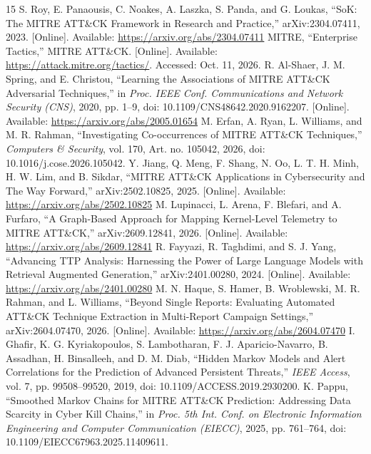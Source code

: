 \documentclass[conference]{IEEEtran}
\begin{document}
\begin{thebibliography}{15}
 S. Roy, E. Panaousis, C. Noakes, A. Laszka, S. Panda, and G. Loukas, ``SoK: The MITRE ATT\&CK Framework in Research and Practice,'' arXiv:2304.07411, 2023. [Online]. Available: \url{https://arxiv.org/abs/2304.07411}
 MITRE, ``Enterprise Tactics,'' MITRE ATT\&CK. [Online]. Available: \url{https://attack.mitre.org/tactics/}. Accessed: Oct. 11, 2026.
 R. Al-Shaer, J. M. Spring, and E. Christou, ``Learning the Associations of MITRE ATT\&CK Adversarial Techniques,'' in \emph{Proc. IEEE Conf. Communications and Network Security (CNS)}, 2020, pp. 1--9, doi: 10.1109/CNS48642.2020.9162207. [Online]. Available: \url{https://arxiv.org/abs/2005.01654}
 M. Erfan, A. Ryan, L. Williams, and M. R. Rahman, ``Investigating Co-occurrences of MITRE ATT\&CK Techniques,'' \emph{Computers \& Security}, vol. 170, Art. no. 105042, 2026, doi: 10.1016/j.cose.2026.105042.
 Y. Jiang, Q. Meng, F. Shang, N. Oo, L. T. H. Minh, H. W. Lim, and B. Sikdar, ``MITRE ATT\&CK Applications in Cybersecurity and The Way Forward,'' arXiv:2502.10825, 2025. [Online]. Available: \url{https://arxiv.org/abs/2502.10825}
 M. Lupinacci, L. Arena, F. Blefari, and A. Furfaro, ``A Graph-Based Approach for Mapping Kernel-Level Telemetry to MITRE ATT\&CK,'' arXiv:2609.12841, 2026. [Online]. Available: \url{https://arxiv.org/abs/2609.12841}
 R. Fayyazi, R. Taghdimi, and S. J. Yang, ``Advancing TTP Analysis: Harnessing the Power of Large Language Models with Retrieval Augmented Generation,'' arXiv:2401.00280, 2024. [Online]. Available: \url{https://arxiv.org/abs/2401.00280}
 M. N. Haque, S. Hamer, B. Wroblewski, M. R. Rahman, and L. Williams, ``Beyond Single Reports: Evaluating Automated ATT\&CK Technique Extraction in Multi-Report Campaign Settings,'' arXiv:2604.07470, 2026. [Online]. Available: \url{https://arxiv.org/abs/2604.07470}
 I. Ghafir, K. G. Kyriakopoulos, S. Lambotharan, F. J. Aparicio-Navarro, B. Assadhan, H. Binsalleeh, and D. M. Diab, ``Hidden Markov Models and Alert Correlations for the Prediction of Advanced Persistent Threats,'' \emph{IEEE Access}, vol. 7, pp. 99508--99520, 2019, doi: 10.1109/ACCESS.2019.2930200.
 K. Pappu, ``Smoothed Markov Chains for MITRE ATT\&CK Prediction: Addressing Data Scarcity in Cyber Kill Chains,'' in \emph{Proc. 5th Int. Conf. on Electronic Information Engineering and Computer Communication (EIECC)}, 2025, pp. 761--764, doi: 10.1109/EIECC67963.2025.11409611.

\end{thebibliography}
\end{document}
